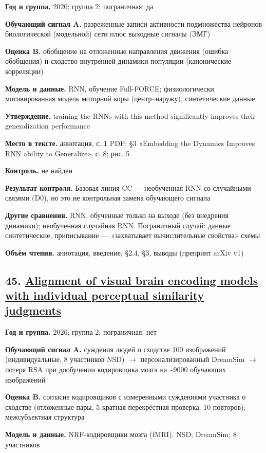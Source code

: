 \textbf{Год и группа.} 2020; группа 2; пограничная: да

\textbf{Обучающий сигнал A.} разреженные записи активности подмножества нейронов биологической (модельной) сети плюс выходные сигналы (ЭМГ)

\textbf{Оценка B.} обобщение на отложенные направления движения (ошибка обобщения) и сходство внутренней динамики популяции (канонические корреляции)

\textbf{Модель и данные.} RNN, обучение Full-FORCE; физиологически мотивированная модель моторной коры (центр–наружу), синтетические данные

\textbf{Утверждение.} training the RNNs with this method significantly improves their generalization performance

\textbf{Место в тексте.} аннотация, с. 1 PDF; §3 «Embedding the Dynamics Improves RNN ability to Generalize», с. 8; рис. 5

\textbf{Контроль.} не найден

\textbf{Результат контроля.} Базовая линия CC — необученная RNN со случайными связями (D0), но это не контрольная замена обучающего сигнала

\textbf{Другие сравнения.} RNN, обученные только на выходе (без внедрения динамики); необученная случайная RNN. Пограничный случай: данные синтетические, приписывание — «захватывает вычислительные свойства» схемы

\textbf{Объём чтения.} аннотация, введение, §2.4, §3, выводы (препринт arXiv v1)


\subsection*{45. \href{https://doi.org/10.48550/arxiv.2610.22569}{Alignment of visual brain encoding models with individual perceptual similarity judgments}}

\textbf{Год и группа.} 2026; группа 2; пограничная: нет

\textbf{Обучающий сигнал A.} суждения людей о сходстве 100 изображений (индивидуальные, 8 участников NSD) $\rightarrow$ персонализированный DreamSim $\rightarrow$ потеря RSA при дообучении кодировщика мозга на \textasciitilde{}9000 обучающих изображений

\textbf{Оценка B.} согласие кодировщиков с измеренными суждениями участника о сходстве (отложенные пары, 5-кратная перекрёстная проверка, 10 повторов); межсубъектная структура

\textbf{Модель и данные.} NRF-кодировщики мозга (fMRI), NSD; DreamSim; 8 участников

